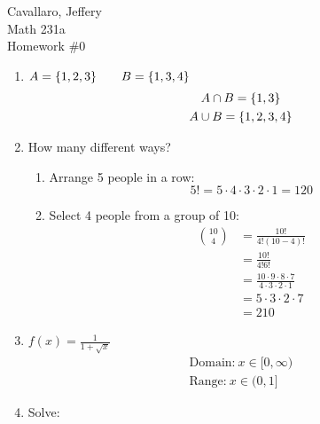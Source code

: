 \documentclass[letterpaper,12pt,fleqn]{article}
\begin{document}
Cavallaro, Jeffery \\
Math 231a \\
Homework \#0

\bigskip

\begin{enumerate}
\item \(A=\{1,2,3\}\qquad B=\{1,3,4\}\)
  \begin{gather*}
    A\cap B=\{1,3\} \\
    A\cup B=\{1,2,3,4\}
  \end{gather*}

\item How many different ways?
  \begin{enumerate}
  \item Arrange 5 people in a row:
    \[5!=5\cdot4\cdot3\cdot2\cdot1=120\]
  \item Select 4 people from a group of 10:
    \begin{align*}
      \binom{10}{4} &= \frac{10!}{4!(10-4)!} \\
      &= \frac{10!}{4! 6!} \\
      &= \frac{10\cdot9\cdot8\cdot7}{4\cdot3\cdot2\cdot1} \\
      &= 5\cdot3\cdot2\cdot7 \\
      &= 210
    \end{align*}
  \end{enumerate}

\item \(\displaystyle f(x)=\frac{1}{1+\sqrt{x}}\)
  \begin{gather*}
    \text{Domain:}\ x\in[0,\infty) \\
    \text{Range:}\ x\in(0,1]
  \end{gather*}

\item Solve:


\end{enumerate}
\end{document}
